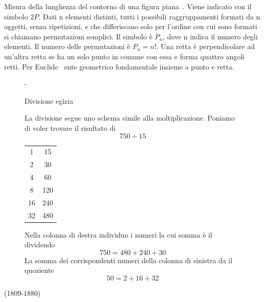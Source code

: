 {Misura della lunghezza del contorno di una figura piana\pointsto~. Viene indicato  con il simbolo $2P$.%
Dati n elementi distinti, tutti i possibili raggruppamenti formati da n oggetti, senza ripetizioni,  e che differiscano solo per l'ordine con cui sono formati si chiamano permutazioni semplici. Il simbolo è $P_n$, dove n indica il numero degli elementi. Il numero delle permutazioni è  $P_n=n!$.
 Una retta è perpendicolare ad un'altra retta se ha un solo punto in comune con essa e forma quattro angoli retti.
Per Euclide\pointsto~ ente geometrico fondamentale insieme a punto e retta. %
\begin{figure}[!htb]
	\def\FrameCommand{\fboxsep=\FrameSep \colorbox{shadecolor}}%
	\begin{MakeFramed}{\advance\hsize-\width \FrameRestore}%
		\begin{center}%
\textcolor{StrongGray}{\textsf{Divisione egizia}}%
			\par%
			\vspace*{-\smallskipamount}%
			\vrule height 0.8pt width 56mm%
		\end{center}%
		\begin{small}%
		La divisione segue uno schema simile alla moltiplicazione. Poniamo di voler trovare il risultato di \[ 750\div 15\]
		\begin{center}
			\begin{tabular}{cc}
			\toprule
				1 & 15 \\ 
				2 & 30 \\ 
				4 & 60 \\ 
				8 & 120 \\ 
				16 & 240 \\ 
				32 & 480 \\ 
			\bottomrule
			\end{tabular} 
		\end{center}
	Nella colonna di destra individuo i numeri la cui somma è il dividendo\[750=480+240+30\] La somma dei corrispondenti numeri della colonna di sinistra da il quoziente\[ 50=2+16+32\]
		\end{small}%
		\vspace*{-\smallskipamount}%
	\end{MakeFramed}%
\end{figure}%
(1809-1880)
}

